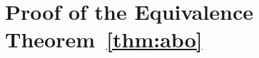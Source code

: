 \documentclass[runningheads]{llncs}       %
\begin{document}











\section{Proof of the Equivalence Theorem~\ref{thm:abo}}
\label{sec:proof}
\end{document}
